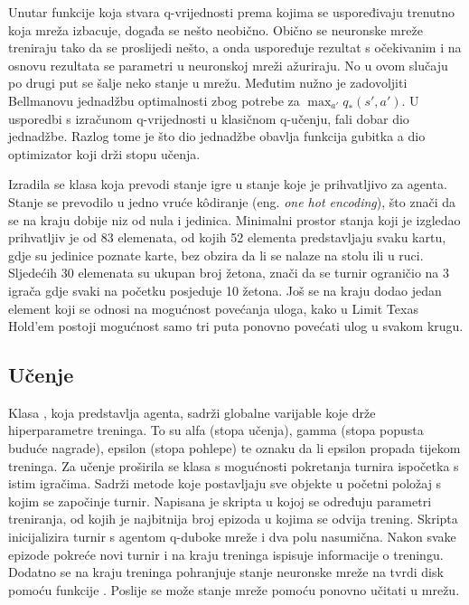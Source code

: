 Unutar funkcije koja stvara q-vrijednosti prema kojima se uspoređivaju trenutno koja mreža izbacuje, događa se nešto neobično. Obično se neuronske mreže treniraju tako da se proslijedi nešto, a onda uspoređuje rezultat s očekivanim i na osnovu rezultata se parametri u neuronskoj mreži ažuriraju. No u ovom slučaju po drugi put se šalje neko stanje u mrežu. Međutim nužno je zadovoljiti Bellmanovu jednadžbu optimalnosti zbog potrebe za $\max_{a'}q_*(s', a')$. U usporedbi s izračunom q-vrijednosti u klasičnom q-učenju, fali dobar dio jednadžbe. Razlog tome je što dio jednadžbe obavlja funkcija gubitka a dio optimizator koji drži stopu učenja.

Izradila se klasa koja prevodi stanje igre u stanje koje je prihvatljivo za agenta. Stanje se prevodilo u jedno vruće k\^odiranje (eng. \textit{one hot encoding}), što znači da se na kraju dobije niz od nula i jedinica.  Minimalni prostor stanja koji je izgledao prihvatljiv je od 83 elemenata, od kojih 52 elementa predstavljaju svaku kartu, gdje su jedinice poznate karte, bez obzira da li se nalaze na stolu ili u ruci. Sljedećih 30 elemenata su ukupan broj žetona, znači da se turnir ograničio na 3 igrača gdje svaki na početku posjeduje 10 žetona. Još se na kraju dodao jedan element koji se odnosi na mogućnost povećanja uloga, kako u Limit Texas Hold'em postoji mogućnost samo tri puta ponovno povećati ulog u svakom krugu.

\subsection{Učenje}
Klasa , koja predstavlja agenta, sadrži globalne varijable koje drže hiperparametre treninga. To su alfa (stopa učenja), gamma (stopa popusta buduće nagrade), epsilon (stopa pohlepe) te oznaku da li epsilon propada tijekom treninga. Za učenje proširila se klasa  s mogućnosti pokretanja turnira ispočetka s istim igračima. Sadrži metode koje postavljaju sve objekte u početni položaj s kojim se započinje turnir. Napisana je skripta u kojoj se određuju parametri treniranja, od kojih je najbitnija broj epizoda u kojima se odvija trening. Skripta inicijalizira turnir s agentom q-duboke mreže i dva polu nasumična. Nakon svake epizode pokreće novi turnir i na kraju treninga ispisuje informacije o treningu. Dodatno se na kraju treninga pohranjuje stanje neuronske mreže na tvrdi disk pomoću funkcije . Poslije se može stanje mreže pomoću  ponovno učitati u mrežu. 

